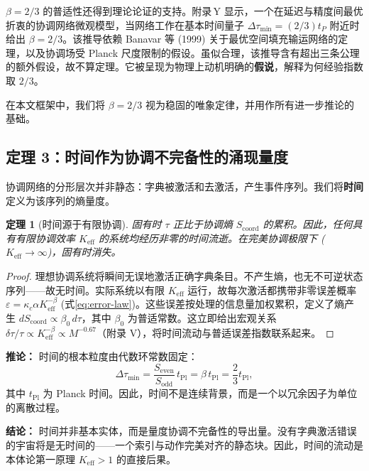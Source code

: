 \documentclass[12pt,a4paper]{article}
\newtheorem{theorem}{定理}[section]
\begin{document}
	\(\beta = 2/3\) 的普适性还得到理论论证的支持。附录 Y 显示，一个在延迟与精度间最优折衷的协调网络微观模型，当网络工作在基本时间量子 \(\Delta\tau_{\min} = (2/3) t_P\) 附近时给出 \(\beta = 2/3\)。该推导依赖 Banavar 等 (1999) 关于最优空间填充输运网络的定理，以及协调场受 Planck 尺度限制的假设。虽似合理，该推导含有超出三条公理的额外假设，故不算定理。它被呈现为物理上动机明确的\textbf{假说}，解释为何经验指数取 \(2/3\)。
	
	在本文框架中，我们将 \(\beta = 2/3\) 视为稳固的唯象定律，并用作所有进一步推论的基础。
	
	\subsection{定理 3：时间作为协调不完备性的涌现量度}
	\label{subsec:time-emergence}
	
	协调网络的分形层次并非静态：字典被激活和去激活，产生事件序列。我们将\textbf{时间}定义为该序列的熵量度。
	
	\begin{theorem}[时间源于有限协调]
		\label{thm:time}
		固有时 \(\tau\) 正比于协调熵 \(S_{\mathrm{coord}}\) 的累积。因此，任何具有有限协调效率 \(K_{\mathrm{eff}}\) 的系统均经历非零的时间流逝。在完美协调极限下 (\(K_{\mathrm{eff}} \to \infty\))，固有时消失。
	\end{theorem}
	
	\begin{proof}
		理想协调系统将瞬间无误地激活正确字典条目。不产生熵，也无不可逆状态序列——故无时间。实际系统以有限 \(K_{\mathrm{eff}}\) 运行，故每次激活都携带非零误差概率 \(\varepsilon = \kappa_c \alpha K_{\mathrm{eff}}^{-\beta}\) (式\ref{eq:error-law})。这些误差按处理的信息量加权累积，定义了熵产生 \(dS_{\mathrm{coord}} \propto \beta_0 \, d\tau\)，其中 \(\beta_0\) 为普适常数。这立即给出宏观关系 \(\delta\tau/\tau \propto K_{\mathrm{eff}}^{-\beta} \propto M^{-0.67}\)（附录 V），将时间流动与普适误差指数联系起来。
	\end{proof}
	
	\noindent
	\textbf{推论：} 时间的根本粒度由代数环常数固定：
	\[
	\Delta \tau_{\min} = \frac{S_{\mathrm{even}}}{S_{\mathrm{odd}}} \, t_{\mathrm{Pl}}
	= \beta \, t_{\mathrm{Pl}} = \frac{2}{3} t_{\mathrm{Pl}},
	\]
	其中 \(t_{\mathrm{Pl}}\) 为 Planck 时间。因此，时间不是连续背景，而是一个以冗余因子为单位的离散过程。
	
	\noindent
	\textbf{结论：} 时间并非基本实体，而是量度协调不完备性的导出量。没有字典激活错误的宇宙将是无时间的——一个索引与动作完美对齐的静态块。因此，时间的流动是本体论第一原理 \(K_{\mathrm{eff}} > 1\) 的直接后果。
	
\end{document}

